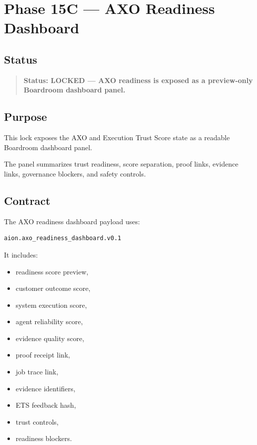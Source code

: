 \section{Phase 15C --- AXO Readiness Dashboard}
\label{sec:phase15c-axo-readiness-dashboard-lock}

\subsection{Status}

\begin{quote}
\textbf{Status: LOCKED --- AXO readiness is exposed as a preview-only Boardroom dashboard panel.}
\end{quote}

\subsection{Purpose}

This lock exposes the AXO and Execution Trust Score state as a readable Boardroom dashboard panel.

The panel summarizes trust readiness, score separation, proof links, evidence links, governance blockers, and safety controls.

\subsection{Contract}

The AXO readiness dashboard payload uses:

\begin{verbatim}
aion.axo_readiness_dashboard.v0.1
\end{verbatim}

It includes:

\begin{itemize}
  \item readiness score preview,
  \item customer outcome score,
  \item system execution score,
  \item agent reliability score,
  \item evidence quality score,
  \item proof receipt link,
  \item job trace link,
  \item evidence identifiers,
  \item ETS feedback hash,
  \item trust controls,
  \item readiness blockers.
\end{itemize}

